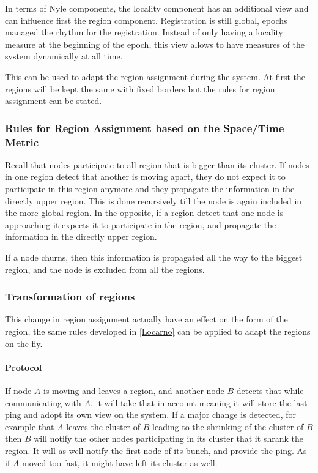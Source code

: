 \documentclass[a4paper,11pt,oneside]{report}
\begin{document}
In terms of Nyle components, the locality component has an additional view and
can influence first the region component. Registration is still global, epochs
managed the rhythm for the registration. Instead of only having a locality
measure at the beginning of the epoch, this view allows to have measures of the
system dynamically at all time. 

This can be used to adapt the region assignment during the system. At first the
regions will be kept the same with fixed borders but the rules for region
assignment can be stated. 

\subsubsection{Rules for Region Assignment based on the Space/Time Metric}
Recall that nodes participate to all region that is bigger than its cluster. If
nodes in one region detect that another is moving apart, they do not expect it
to participate in this region anymore and they propagate the information in the
directly upper region. This is done recursively till the node is again included
in the more global region.  In the opposite, if a region detect that one node
is approaching it expects it to participate in the region, and propagate the
information in the directly upper region.

If a node churns, then this information is propagated all the way to the
biggest region, and the node is excluded from all the regions. 

\subsubsection{Transformation of regions}
This change in region assignment actually have an effect on the form of the
region, the same rules developed in \ref{Locarno} can be applied to adapt the
regions on the fly. 

\paragraph{Protocol}
If node $A$ is moving and leaves a region, and another node $B$ detects that
while communicating with $A$, it will take that in account meaning it will
store the last ping and adopt its own view on the system. If a major change is
detected, for example that $A$ leaves the cluster of $B$ leading to the
shrinking of the cluster of $B$ then $B$ will notify the other nodes
participating in its cluster that it shrank the region. It will as well notify
the first node of its bunch, and provide the ping. As if $A$ moved too fast, it
might have left its cluster as well. 
\end{document}
